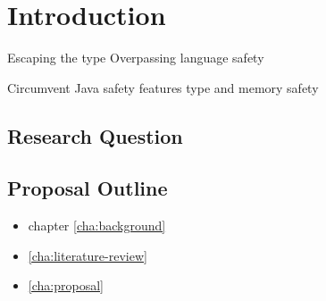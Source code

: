 
\chapter{Introduction}


\cite{milner_theory_1978}

Escaping the type 
Overpassing 
language safety

Circumvent Java safety features
type and memory safety

\section{Research Question}


\section{Proposal Outline}

\begin{itemize}
\item chapter \ref{cha:background}
\item \ref{cha:literature-review}
\item \ref{cha:proposal}
\end{itemize}
